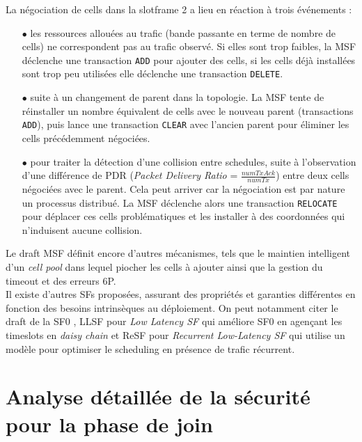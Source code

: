 \documentclass[]{report}
\begin{document}
\par La négociation de cells dans la slotframe 2 a lieu en réaction à trois événements :
\begin{itemize}
\item[$\bullet$] les ressources allouées au trafic (bande passante en terme de nombre de cells) ne correspondent pas au trafic observé. Si elles sont trop faibles, la MSF déclenche une transaction \texttt{ADD} pour ajouter des cells, si les cells déjà installées sont trop peu utilisées elle déclenche une transaction \texttt{DELETE}. 
\vspace{0.1cm}
\item[$\bullet$] suite à un changement de parent dans la topologie. La MSF tente de réinstaller un nombre équivalent de cells avec le nouveau parent (transactions \texttt{ADD}), puis lance une transaction \texttt{CLEAR} avec l'ancien parent pour éliminer les cells précédemment négociées.
\vspace{0.1cm}
\item[$\bullet$] pour traiter la détection d'une collision entre schedules, suite à l'observation d'une différence de PDR (\textit{Packet Delivery Ratio} = $\frac{numTxAck}{numTx}$) entre deux cells négociées avec le parent. Cela peut arriver car la négociation est par nature un processus distribué. La MSF déclenche alors une transaction \texttt{RELOCATE} pour déplacer ces cells problématiques et les installer à des coordonnées qui n'induisent aucune collision.
\end{itemize}

\vspace{0.4cm}

\par Le draft MSF \cite{ietf-6tisch-msf-10} définit encore d'autres mécanismes, tels que le maintien intelligent d'un \textit{cell pool} dans lequel piocher les cells à ajouter ainsi que la gestion du timeout et des erreurs 6P.\\

Il existe d'autres SFs proposées, assurant des propriétés et garanties différentes en fonction des besoins intrinsèques au déploiement. On peut notamment citer le draft de la SF0 \cite{ietf-6tisch-6top-sf0-05}, LLSF pour \textit{Low Latency SF} \cite{LLSF} qui améliore SF0 en agençant les timeslots en \textit{daisy chain} et ReSF pour \textit{Recurrent Low-Latency SF} \cite{ReSF} qui utilise un modèle pour optimiser le scheduling en présence de trafic récurrent.

	
\chapter{Analyse détaillée de la sécurité pour la phase de join}
\label{joining_analysis}
\newpage
\end{document}
